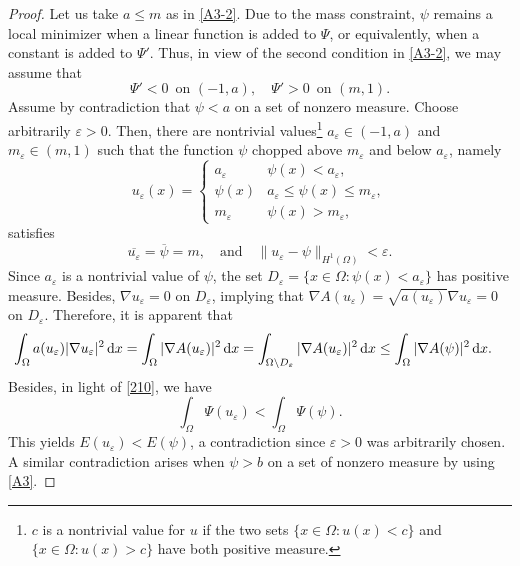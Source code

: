 \documentclass[11pt,reqno]{amsart}
\theoremstyle{remark}
\def\d{{\rm d}}
\numberwithin{equation}{section}
\def\d{{\rm d}}
\newcommand{\eps}{\ensuremath{\varepsilon}}
\begin{document}
\begin{proof}
Let us take $a\leq m$ as in \eqref{A3-2}. Due to the mass constraint, $\psi$ remains a local minimizer when a linear function is added to $\Psi$, or equivalently, when a
constant is added to $\Psi'$. Thus, in view of the second condition in \eqref{A3-2}, we may assume that
\begin{equation}
\label{210}\Psi' < 0 \,\text{ on }(-1,a), \quad \Psi' > 0 \,\text{ on } (m, 1).
\end{equation}
Assume by contradiction that
$\psi <a$ on a set of nonzero measure.
Choose arbitrarily $\eps>0$. Then, there are nontrivial values\footnote{$c$ is a nontrivial value for $u$ if the two sets $\{x\in\Omega: u(x)<c\}$ and $\{x\in\Omega: u(x)>c\}$ have both positive measure.} $a_\eps\in (-1,a)$ and $m_\eps\in (m,1)$ such that the function $\psi$ chopped above $m_\eps$ and below $a_\eps$, namely
$$
u_\eps(x)=\begin{cases} a_\eps& \psi(x) <a_\eps,\\
\psi(x)&a_\eps\leq  \psi(x)\leq m_\eps,\\
m_\eps & \psi(x)> m_\eps,
\end{cases}
$$
satisfies
\begin{equation}
\label{claim-matano}
\overline{u_\eps}=\overline{\psi}=m,\quad \text{and}\quad \|u_\eps-\psi\|_{H^1(\Omega)}<\eps.
\end{equation}
Since $a_\eps$ is a nontrivial value of $\psi$, the set
$D_\eps=\{x\in \Omega: \psi(x)<a_\eps\}$ 
has positive measure. Besides, $\nabla u_\eps=0$ on $D_\eps$, implying that $\nabla A(u_\eps)=\sqrt{a(u_\eps)}\nabla u_\eps=0$ on $D_\eps$. Therefore, it is apparent that
\begin{align*}
\int_\Omega a(u_\eps)|\nabla u_\eps|^2\, \d x
&=\int_\Omega |\nabla A(u_\eps)|^2\, \d x
=\int_{\Omega\setminus D_\eps}|\nabla A(u_\eps)|^2\, \d x
\leq \int_\Omega |\nabla A(\psi)|^2\, \d x.
\end{align*}
%
Besides, in light of \eqref{210}, we have
$$\int_\Omega \Psi(u_\eps) < \int_\Omega \Psi(\psi).$$
This yields $E(u_\eps) < E(\psi)$,
a contradiction since $\eps>0$ was arbitrarily chosen. A similar contradiction arises when
$\psi>b$ on a set of nonzero measure by using \eqref{A3}.
\end{proof}
\end{document}
